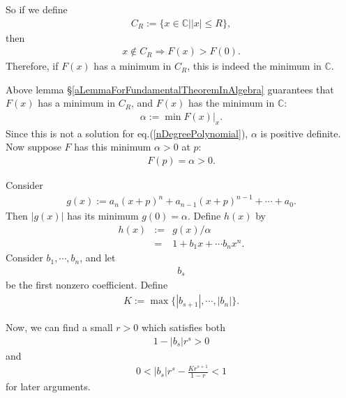 \documentclass[11pt]{book}
\begin{document}
So if we define 
\begin{eqnarray}
C_R := \{x \in \mathbb{C} | |x| \leq R\},
\end{eqnarray}
then
\begin{eqnarray}
x \notin C_R \Rightarrow F(x) > F(0).
\end{eqnarray}
Therefore, if $F(x)$ has a minimum in $C_R$, this is indeed the minimum in $\mathbb{C}$.

Above lemma \S\ref{aLemmaForFundamentalTheoremInAlgebra} guarantees that $F(x)$ has a minimum in $C_R$, and $F(x)$ has the minimum in $\mathbb{C}$:
\begin{eqnarray}
\alpha := \min \left. F(x) \right|_x.
\end{eqnarray}
Since this is not a solution for eq.(\ref{nDegreePolynomial}), $\alpha$ is positive definite.
Now suppose $F$ has this minimum $\alpha>0$ at $p$:
\begin{eqnarray}
F(p) = \alpha > 0.
\end{eqnarray}

Consider
\begin{eqnarray}
g(x) := a_n (x+p)^n + a_{n-1} (x+p)^{n-1} + \cdots + a_0.
\end{eqnarray}
Then $|g(x)|$ has its minimum $g(0) = \alpha$.
Define $h(x)$ by 
\begin{eqnarray}
h(x)&:=& g(x)/\alpha\\ 
&=& 1 + b_1 x + \cdots b_n x^n.
\end{eqnarray}
Consider $b_1, \cdots, b_n$, and let
\begin{eqnarray}
b_s
\end{eqnarray}
be the first nonzero coefficient.
Define
\begin{eqnarray}
K := \max \{ |b_{s+1}|, \cdots, |b_n| \}.
\end{eqnarray}

Now, we can find a small $r>0$ which satisfies both
\begin{eqnarray}
1 - |b_s| r^s > 0
\end{eqnarray}
and
\begin{eqnarray}
0 < |b_s| r^s - \frac{K r^{s+1}}{1-r} < 1
\end{eqnarray}
for later arguments.
\end{document}

